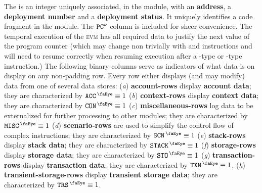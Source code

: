 The \CFI{} is an integer uniquely associated, in the \romLexMod{} module, with an \textbf{address}, a \textbf{deployment number} and a \textbf{deployment status}. It uniquely identifies a code fragment in the \romMod{} module. The $\texttt{PC}^{\nu}$ column is included for sheer convenience. The temporal execution of the \textsc{evm} has all required data to justify the next value of the program counter (which may change non trivially with  and  instructions and will need to resume correctly when resuming execution after a -type or -type instruction.)
The following binary columns serve as indicators of what data is on display on any non-padding row. Every row either displays (and may modify) data from one of several data stores:
(\emph{a}) \textbf{account-rows} display \textbf{account data};                                             they are characterized by $\peekAccount     \equiv 1$
(\emph{b}) \textbf{context-rows} display \textbf{context data};                                             they are characterized by $\peekContext     \equiv 1$
(\emph{c}) \textbf{miscellaneous-rows} log data to be externalized for further processing to other modules; they are characterized by $\peekMisc        \equiv 1$
(\emph{d}) \textbf{scenario-rows} are used to simplify the control flow of complex instructions;            they are characterized by $\peekScenario    \equiv 1$
(\emph{e}) \textbf{stack-rows} display \textbf{stack data};                                                 they are characterized by $\peekStack       \equiv 1$
(\emph{f}) \textbf{storage-rows} display \textbf{storage data};                                             they are characterized by $\peekStorage     \equiv 1$
(\emph{g}) \textbf{transaction-rows} display \textbf{transaction data};                                     they are characterized by $\peekTransaction \equiv 1$.
(\emph{h}) \textbf{transient-storage-rows} display \textbf{transient storage data};                         they are characterized by $\peekTransient   \equiv 1$.
